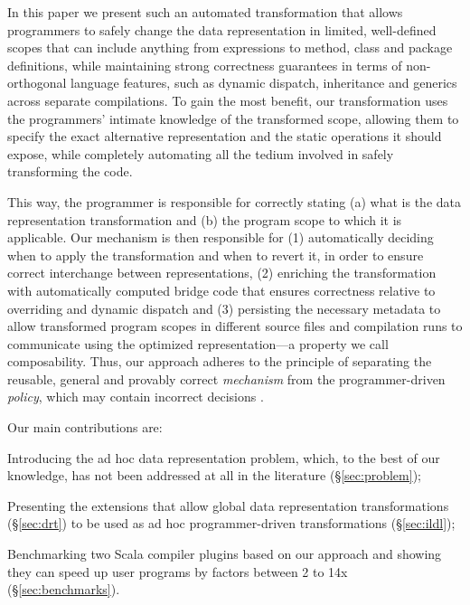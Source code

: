In this paper we present such an automated transformation that allows
programmers to safely change the data representation in limited,
well-defined scopes that can include anything from expressions to
method, class and package definitions, while maintaining strong
correctness guarantees in terms of non-orthogonal language features,
such as dynamic dispatch, inheritance and generics across separate
compilations.
To gain the most benefit, our transformation uses the programmers'
intimate knowledge of the transformed scope, allowing them to specify
the exact alternative representation and the static operations it
should expose, while completely automating all the tedium involved in
safely transforming the code.

This way, the programmer is responsible for correctly stating (a)
what is the data representation transformation and (b) the program
scope to which it is applicable. Our mechanism is then
responsible for (1) automatically deciding when to apply the
transformation and when to revert it, in order to ensure correct
interchange between representations, (2) enriching the transformation
with automatically computed bridge code that ensures correctness
relative to overriding and dynamic dispatch and (3) persisting
the necessary metadata to allow transformed program scopes in
different source files and compilation runs to communicate using
the optimized representation---a property we call composability.
Thus, our approach adheres to the principle of separating the
reusable, general and provably correct \emph{mechanism} from the
programmer-driven \emph{policy}, which may contain incorrect
decisions \cite{lampson-mechanism-policy}.

Our main contributions are:
\begin{compactitem}
  \item Introducing the ad hoc data representation problem, which, to the
    best of our knowledge, has not been addressed at all in the
    literature (\S\ref{sec:problem});
  \item Presenting the extensions that allow global data
    representation transformations (\S\ref{sec:drt}) to be used as
    ad hoc programmer-driven transformations (\S\ref{sec:ildl});
  \item Benchmarking two Scala compiler plugins based on our approach
    and showing they can speed up user programs by factors between 2
    to 14x (\S\ref{sec:benchmarks}).
\end{compactitem}


